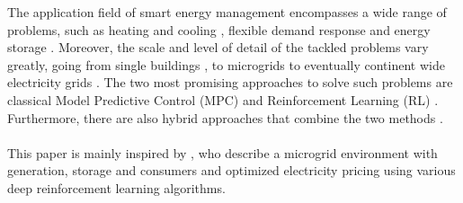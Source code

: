 The application field of smart energy management encompasses a wide range of problems, such as heating  and cooling \cite{Blum.2021}\cite{ThomasSchreiber.2020}, flexible demand response \cite{Jin.2021} and energy storage \cite{Nakabi.2021}. Moreover, the scale and level of detail of the tackled problems vary greatly, going from single buildings \cite{Blum.2021}, to microgrids \cite{Nakabi.2021} \cite{Castellanos.04.12.2022} to eventually continent wide electricity grids \cite{Horsch.2018}. The two most promising approaches to solve such problems are classical Model Predictive Control (MPC) \cite{Basantes.2023} and Reinforcement Learning (RL) \cite{Nakabi.2021} \cite{Jin.2021} \cite{ThomasSchreiber.2020}\cite{Zhu.2022}. Furthermore, there are also hybrid approaches that combine the two methods \cite{JavierArroyo.2022}.
\\~\\
This paper is mainly inspired by \cite{Nakabi.2021}, who describe a microgrid environment with generation, storage and consumers and optimized electricity pricing
using various deep reinforcement learning algorithms.